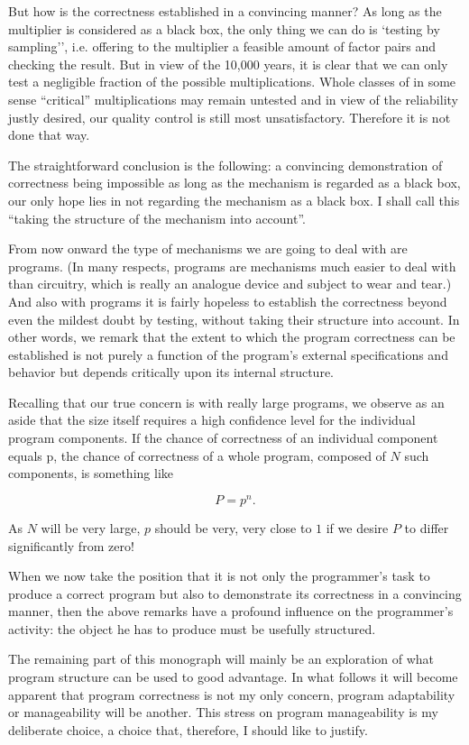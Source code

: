 But how is the correctness established in a convincing manner? As long as the multiplier is considered as a black box, the only thing we can do is `testing by sampling'', i.e. offering to the multiplier a feasible amount of factor pairs and checking the result. But in view of the 10,000 years, it is clear that we can only test a negligible fraction of the possible multiplications. Whole classes of in some sense ``critical'' multiplications may remain untested and in view of the reliability justly desired, our quality control is still most unsatisfactory. Therefore it is not done that way.

The straightforward conclusion is the following: a convincing demonstration of correctness being impossible as long as the mechanism is regarded
as a black box, our only hope lies in not regarding the mechanism as a black box. I shall call this ``taking the structure of the mechanism into account''.

From now onward the type of mechanisms we are going to deal with are programs. (In many respects, programs are mechanisms much easier to deal
with than circuitry, which is really an analogue device and subject to wear and tear.) And also with programs it is fairly hopeless to establish the correctness beyond even the mildest doubt by testing, without taking their structure into account. In other words, we remark that the extent to which the program correctness can be established is not purely a function of the program's external specifications and behavior but depends critically upon its internal structure.

Recalling that our true concern is with really large programs, we observe as an aside that the size itself requires a high confidence level for the individual program components. If the chance of correctness of an individual component equals p, the chance of correctness of a whole program, composed of $N$ such components, is something like

$$
P=p^n.
$$

As $N$ will be very large, $p$ should be very, very close to $1$ if we desire $P$ to differ significantly from zero!

When we now take the position that it is not only the programmer's task to produce a correct program but also to demonstrate its correctness in a convincing manner, then the above remarks have a profound influence on the programmer's activity: the object he has to produce must be usefully
structured.

The remaining part of this monograph will mainly be an exploration of what program structure can be used to good advantage. In what follows it will become apparent that program correctness is not my only concern, program adaptability or manageability will be another. This stress on program manageability is my deliberate choice, a choice that, therefore, I should like to justify.

